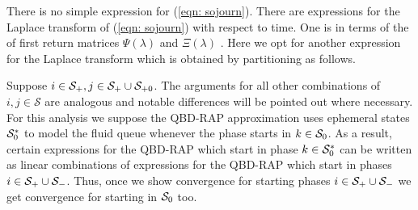 There is no simple expression for (\ref{eqn: sojourn}). There are expressions for the Laplace transform of (\ref{eqn: sojourn}) with respect to time. One is in terms of the of first return matrices \(\Psi(\lambda)\) and \(\Xi(\lambda)\) \citep{bean2009}. Here we opt for another expression for the Laplace transform which is obtained by partitioning as follows.

Suppose \(i\in\mathcal{S}_+,j\in\mathcal S_+\cup\mathcal S_{+0}\). The arguments for all other combinations of \(i,j\in\mathcal S\) are analogous and notable differences will be pointed out where necessary. For this analysis we suppose the QBD-RAP approximation uses ephemeral states \(\mathcal{S}_0^*\) to model the fluid queue whenever the phase starts in \(k\in\mathcal{S}_0\). As a result, certain expressions for the QBD-RAP which start in phase \(k\in\mathcal{S}_0^*\) can be written as linear combinations of expressions for the QBD-RAP which start in phases \(i\in\mathcal{S}_+\cup\mathcal{S}_-\). Thus, once we show convergence for starting phases \(i\in\mathcal{S}_+\cup\mathcal{S}_-\) we get convergence for starting in \(\mathcal{S}_0\) too. 

